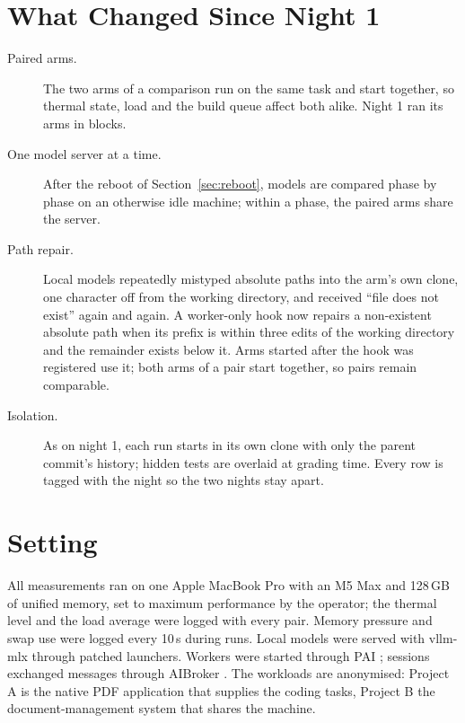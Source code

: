 \section{What Changed Since Night 1}\label{sec:changes}

\begin{description}
	\item[Paired arms.] The two arms of a comparison run on the same task and start together, so thermal state, load and
	the build queue affect both alike. Night 1 ran its arms in blocks.
	\item[One model server at a time.] After the reboot of Section~\ref{sec:reboot}, models are compared phase by
	phase on an otherwise idle machine; within a phase, the paired arms share the server.
	\item[Path repair.] Local models repeatedly mistyped absolute paths into the arm's own clone, one character off from
	the working directory, and received ``file does not exist'' again and again. A worker-only hook now repairs a
	non-existent absolute path when its prefix is within three edits of the working directory and the remainder exists
	below it. Arms started after the hook was registered use it; both arms of a pair start together, so pairs remain
	comparable.
	\item[Isolation.] As on night 1, each run starts in its own clone with only the parent commit's history; hidden tests
	are overlaid at grading time. Every row is tagged with the night so the two nights stay apart.
\end{description}

\section{Setting}\label{sec:setting}

All measurements ran on one Apple MacBook Pro with an M5 Max and 128\,GB of unified memory, set to maximum
performance by the operator; the thermal level and the load average were logged with every pair. Memory pressure and
swap use were logged every 10\,s during runs. Local models were served with vllm-mlx \citep{vllm-mlx-2026aa} through
patched launchers. Workers were started through PAI \citep{Nott-2026aa}; sessions exchanged messages through AIBroker
\citep{Nott-2026ab}. The workloads are anonymised: Project A is the native PDF application that supplies the coding
tasks, Project B the document-management system that shares the machine.

